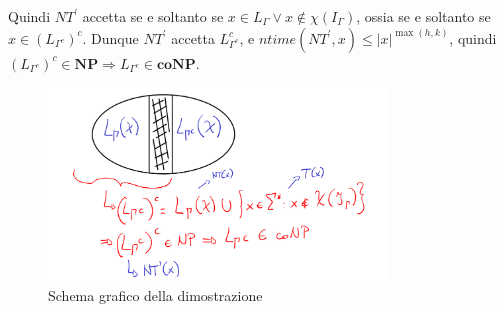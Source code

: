 Quindi $NT^{'}$ accetta se e soltanto se $x \in L_{\Gamma} \lor x \notin \chi(I_{\Gamma})$, ossia se e soltanto se $x \in (L_{\Gamma^c})^c$.
Dunque $NT^{'}$ accetta $L_{\Gamma^c}^c$, e $ntime(NT^{'}, x) \leq |x|^{\max(h, k)}$, quindi $(L_{\Gamma^c})^c \in \textbf{NP} \Rightarrow L_{\Gamma^c} \in \textbf{coNP}$.

\begin{figure}[h]
    \centering
    \includegraphics[width=0.8\textwidth]{../img/th7.png}
    \caption{Schema grafico della dimostrazione}
  \end{figure}